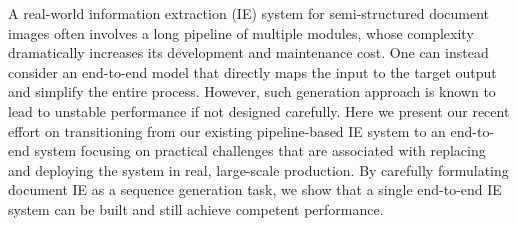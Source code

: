 A real-world information extraction (IE) system for semi-structured document images often involves a long pipeline of multiple modules, whose complexity dramatically increases its development and maintenance cost. One can instead consider an end-to-end model that directly maps the input to the target output and simplify the entire process. However, such generation approach is known to lead to unstable performance if not designed carefully. Here we present our recent effort on transitioning from our existing pipeline-based IE system to an end-to-end system focusing on practical challenges that are associated with replacing and deploying the system in real, large-scale production. By carefully formulating document IE as a sequence generation task, we show that a single end-to-end IE system can be built and still achieve competent performance.
